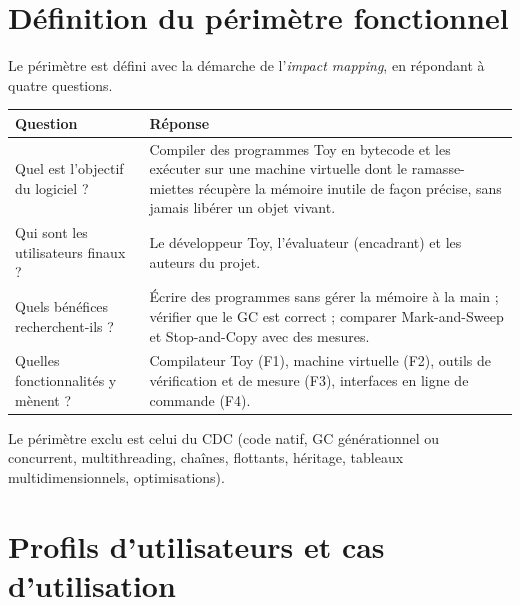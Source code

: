 \documentclass[11pt,a4paper]{article}
\begin{document}
\section{Définition du périmètre fonctionnel}

Le périmètre est défini avec la démarche de l'\emph{impact mapping}, en répondant à quatre questions.

\begin{longtable}{@{}p{} p{}@{}}
\toprule
\textbf{Question} & \textbf{Réponse} \\
\midrule
\endhead
Quel est l'objectif du logiciel ? & Compiler des programmes Toy en bytecode et les exécuter sur une machine virtuelle dont le ramasse-miettes récupère la mémoire inutile de façon précise, sans jamais libérer un objet vivant. \\
Qui sont les utilisateurs finaux ? & Le développeur Toy, l'évaluateur (encadrant) et les auteurs du projet. \\
Quels bénéfices recherchent-ils ? & Écrire des programmes sans gérer la mémoire à la main ; vérifier que le GC est correct ; comparer Mark-and-Sweep et Stop-and-Copy avec des mesures. \\
Quelles fonctionnalités y mènent ? & Compilateur Toy (F1), machine virtuelle (F2), outils de vérification et de mesure (F3), interfaces en ligne de commande (F4). \\
\bottomrule
\end{longtable}

Le périmètre exclu est celui du CDC (code natif, GC générationnel ou concurrent, multithreading, chaînes, flottants, héritage, tableaux multidimensionnels, optimisations).

\section{Profils d'utilisateurs et cas d'utilisation}
\end{document}
